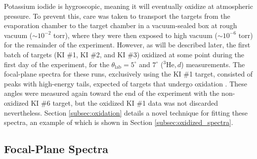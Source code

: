 Potassium iodide is hygroscopic, meaning it will eventually oxidize at atmospheric pressure. To prevent this, care was taken to transport the targets from the evaporation chamber to the target chamber in a vacuum-sealed box at rough vacuum ($\sim 10^{-2}$ torr), where they were then exposed to high vacuum ($\sim 10^{-6}$ torr) for the remainder of the experiment. However, as will be described later, the first batch of targets (KI $\#$1, KI $\#$2, and KI $\#$3) oxidized at some point during the first day of the experiment, for the $\theta_{\mathrm{lab}} = 5^{\circ}$ and $7^{\circ}$ ($^{3}\mathrm{He},d$) measurements. The focal-plane spectra for these runs, exclusively using the KI $\#$1 target, consisted of peaks with high-energy tails, expected of targets that undergo oxidation \cite{Landau1944}. These angles were measured again toward the end of the experiment with the non-oxidized KI $\#$6 target, but the oxidized KI $\#$1 data was not discarded nevertheless. Section \ref{subsec:oxidation} details a novel technique for fitting these spectra, an example of which is shown in Section \ref{subsec:oxidized_spectra}.

\subsection{Focal-Plane Spectra}

\def\yTS{1.29} %
\def\xTS{2.165} %

